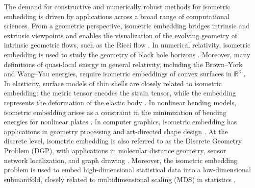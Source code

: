 \documentclass[11pt,a4paper,oneside,reqno]{amsart}
\theoremstyle{definition}
\theoremstyle{plain}
\numberwithin{theorem}{section}
\numberwithin{proposition}{section}
\numberwithin{lemma}{section}
\numberwithin{equation}{section}
\newcommand{\GZ}[1]{{[\color{magenta}GZ:~#1}]}
\begin{document}
The demand for constructive and numerically robust methods for isometric embedding is driven by applications across a broad range of computational sciences. From a geometric perspective, isometric embedding bridges intrinsic and extrinsic viewpoints and enables the visualization of the evolving geometry of intrinsic geometric flows, such as the Ricci flow \cite{rubinstein2005visualizing}. In numerical relativity, isometric embedding is used to study the geometry of black hole horizons \cite{bondarescu2002isometric,tichy2014new, ray2015adiabatic, jasiulek2012isometric}. Moreover, many definitions of quasi-local energy in general relativity, including the Brown--York and Wang--Yau energies, require isometric embeddings of convex surfaces in $\mathbb{R}^3$ \cite{BrownYork1993, wang2009quasilocal}. In elasticity, surface models of thin shells are closely related to isometric embedding: the metric tensor encodes the strain tensor, while the embedding represents the deformation of the elastic body \cite{ciarlet2022mathematical, ciarlet2016korn}. In nonlinear bending models, isometric embedding arises as a constraint in the minimization of bending energies for nonlinear plates \cite{bartels2017bilayer}. In computer graphics, isometric embedding has applications in geometry processing and art-directed shape design \cite{chern2018shape}. At the discrete level, isometric embedding is also referred to as the Discrete Geometry Problem (DGP), with applications in molecular distance geometry, sensor network localization, and graph drawing \cite{liberti2011molecular}. Moreover, the isometric embedding problem is used to embed high-dimensional statistical data into a low-dimensional submanifold, closely related to multidimensional scaling (MDS) in statistics \cite{borg2005modern}.

\end{document}
